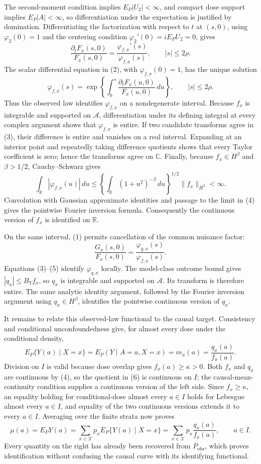 The second-moment condition implies \(E_P|U_2|<\infty\), and compact dose support implies \(E_P|A|<\infty\), so differentiation under the expectation is justified by domination.  Differentiating the factorization with respect to \(t\) at \((s,0)\), using \(\varphi_2(0)=1\) and the centering condition \(\varphi_2'(0)=iE_PU_2=0\), gives
\[
\frac{\partial_tF_x(s,0)}{F_x(s,0)}
=\frac{\varphi_{f,x}'(s)}{\varphi_{f,x}(s)},
\qquad |s|\le2\rho. \tag{2}
\]
The scalar differential equation in (2), with \(\varphi_{f,x}(0)=1\), has the unique solution
\[
\varphi_{f,x}(s)=
\exp\!\left\{\int_0^s
\frac{\partial_tF_x(u,0)}{F_x(u,0)}\,du\right\},
\qquad |s|\le2\rho. \tag{3}
\]
Thus the observed law identifies \(\varphi_{f,x}\) on a nondegenerate interval.  Because \(f_x\) is integrable and supported on \(\mathcal A\), differentiation under its defining integral at every complex argument shows that \(\varphi_{f,x}\) is entire.  If two candidate transforms agree in (3), their difference is entire and vanishes on a real interval.  Expanding at an interior point and repeatedly taking difference quotients shows that every Taylor coefficient is zero; hence the transforms agree on \(\mathbb C\).  Finally, because \(f_x\in H^\beta\) and \(\beta>1/2\), Cauchy--Schwarz gives
\[
\int_{\mathbb R}|\varphi_{f,x}(u)|\,du
\le
\left\{\int_{\mathbb R}(1+u^2)^{-\beta}\,du\right\}^{1/2}
\|f_x\|_{H^\beta}<\infty. \tag{4}
\]
Convolution with Gaussian approximate identities and passage to the limit in (4) gives the pointwise Fourier inversion formula.  Consequently the continuous version of \(f_x\) is identified on \(\mathbb R\).

On the same interval, (1) permits cancellation of the common nuisance factor:
\[
\frac{G_x(s,0)}{F_x(s,0)}
=\frac{\varphi_{q,x}(s)}{\varphi_{f,x}(s)}. \tag{5}
\]
Equations (3)--(5) identify \(\varphi_{q,x}\) locally.  The model-class outcome bound gives \(|q_x|\le B_Yf_x\), so \(q_x\) is integrable and supported on \(\mathcal A\).  Its transform is therefore entire.  The same analytic identity argument, followed by the Fourier inversion argument using \(q_x\in H^\beta\), identifies the pointwise continuous version of \(q_x\).

It remains to relate this observed-law functional to the causal target.  Consistency and conditional unconfoundedness give, for almost every dose under the conditional density,
\[
E_P\{Y(a)\mid X=x\}
=E_P(Y\mid A=a,X=x)
=m_x(a)=\frac{q_x(a)}{f_x(a)}. \tag{6}
\]
Division on \(I\) is valid because dose overlap gives \(f_x(a)\ge\kappa>0\).  Both \(f_x\) and \(q_x\) are continuous by (4), so the quotient in (6) is continuous on \(I\); the causal-mean-continuity condition supplies a continuous version of the left side.  Since \(f_x\ge\kappa\), an equality holding for conditional-dose almost every \(a\in I\) holds for Lebesgue almost every \(a\in I\), and equality of the two continuous versions extends it to every \(a\in I\).  Averaging over the finite strata now proves
\[
\mu(a)=E_PY(a)
=\sum_{x\in\mathcal X}p_xE_P\{Y(a)\mid X=x\}
=\sum_{x\in\mathcal X}p_x\frac{q_x(a)}{f_x(a)},
\qquad a\in I.
\]
Every quantity on the right has already been recovered from \(P_{\mathrm{obs}}\), which proves identification without confusing the causal curve with its identifying functional.

